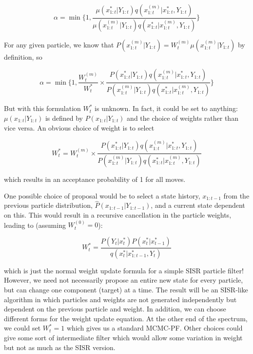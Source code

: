 \begin{equation}
\alpha = \min \bigg \{ 1, \frac{\mu(x_{1:t}^{*}|Y_{1:t})q(x_{1:t}^{(m)}|x_{1:t}^{*}, Y_{1:t})}{\mu(x_{1:t}^{(m)}|Y_{1:t})q(x_{1:t}^{*}|x_{1:t}^{(m)}, Y_{1:t})} \bigg \}
\end{equation}

For any given particle, we know that $P(x_{1:t}^{(m)}|Y_{1:t}) = W_t^{(m)} \mu(x_{1:t}^{(m)}|Y_{1:t})$ by definition, so

\begin{equation}
\alpha = \min \bigg \{ 1, \frac{W_t^{(m)}}{W_t^{*}} \times \frac{P(x_{1:t}^{*}|Y_{1:t})q(x_{1:t}^{(m)}|x_{1:t}^{*}, Y_{1:t})}{P(x_{1:t}^{(m)}|Y_{1:t})q(x_{1:t}^{*}|x_{1:t}^{(m)}, Y_{1:t})} \bigg \}
\end{equation}

But with this formulation $W_t^{*}$ is unknown. In fact, it could be set to anything: $\mu(x_{1:t}|Y_{1:t})$ is defined by $P(x_{1:t}|Y_{1:t})$ and the choice of weights rather than vice versa. An obvious choice of weight is to select

\begin{equation}
W_t^{*} = W_t^{(m)} \times \frac{P(x_{1:t}^{*}|Y_{1:t})q(x_{1:t}^{(m)}|x_{1:t}^{*}, Y_{1:t})}{P(x_{1:t}^{(m)}|Y_{1:t})q(x_{1:t}^{*}|x_{1:t}^{(m)}, Y_{1:t})}
\end{equation}

which results in an acceptance probability of 1 for all moves.

One possible choice of proposal would be to select a state history, $x_{1:t-1}$ from the previous particle distribution, $\hat{P}(x_{1:t-1}|Y_{1:t-1})$, and a current state dependent on this. This would result in a recursive cancellation in the particle weights, leading to (assuming $W_t^{(0)}=0$):

\begin{equation}
W_t^{*} = \frac{P(Y_t|x_t^{*})P(x_t^{*}|x_{t-1}^{*})}{q(x_{t}^{*}|x_{1:t-1}^{*}, Y_{t})}
\end{equation}

which is just the normal weight update formula for a simple SISR particle filter! However, we need not necessarily propose an entire new state for every particle, but can change one component (target) at a time. The result will be an SISR-like algorithm in which particles and weights are not generated independently but dependent on the previous particle and weight. In addition, we can choose different forms for the weight update equation. At the other end of the spectrum, we could set $W_t^{*}=1$ which gives us a standard MCMC-PF. Other choices could give some sort of intermediate filter which would allow some variation in weight but not as much as the SISR version.

